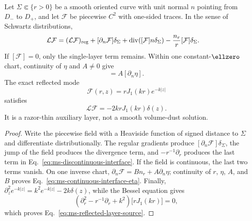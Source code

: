 \begin{proposition}
\label{prop:ms-distributional-interface}
Let $\Sigma\Subset\{r>0\}$ be a smooth oriented curve with unit normal $n$
pointing from $D_-$ to $D_+$, and let $\mathcal F$ be piecewise $C^2$ with
one-sided traces. In the sense of Schwartz distributions,
\begin{align}
\mathcal L\mathcal F
={}&(\mathcal L\mathcal F)_{\rm reg}
+[\partial_n\mathcal F]\delta_\Sigma
+\operatorname{div}\!\left([\mathcal F]n\delta_\Sigma\right)
-\frac{n_r}{r}[\mathcal F]\delta_\Sigma.
\label{eq:ms-discontinuous-interface}
\end{align}
If $[\mathcal F]=0$, only the single-layer term remains. Within one
constant-$\ellzero$ chart, continuity of $\eta$ and $A\neq0$ give
\begin{equation}
[\partial_n\mathcal F]=A[\partial_n\eta].
\label{eq:ms-continuous-interface-eta}
\end{equation}
The exact reflected mode
\begin{equation}
\mathcal F(r,z)=rJ_1(kr)e^{-k|z|}
\label{eq:ms-reflected-layer-mode}
\end{equation}
satisfies
\begin{equation}
\mathcal L\mathcal F=-2krJ_1(kr)\delta(z).
\label{eq:ms-reflected-layer-source}
\end{equation}
It is a razor-thin auxiliary layer, not a smooth volume-dust solution.
\end{proposition}

\begin{proof}
Write the piecewise field with a Heaviside function of signed distance to
$\Sigma$ and differentiate distributionally. The regular gradients produce
$[\partial_n\mathcal F]\delta_\Sigma$, the jump of the field produces the
divergence term, and $-r^{-1}\partial_r$ produces the last term in
Eq.~\eqref{eq:ms-discontinuous-interface}. If the field is continuous, the
last two terms vanish. On one inverse chart,
$\partial_n\mathcal F=B n_r+A\partial_n\eta$; continuity of $r$, $\eta$,
$A$, and $B$ proves Eq.~\eqref{eq:ms-continuous-interface-eta}. Finally,
$\partial_z^2e^{-k|z|}=k^2e^{-k|z|}-2k\delta(z)$, while the Bessel equation
gives
$$
\left(\partial_r^2-r^{-1}\partial_r+k^2\right)
\bigl[rJ_1(kr)\bigr]=0,
$$
which proves Eq.~\eqref{eq:ms-reflected-layer-source}.
\end{proof}

